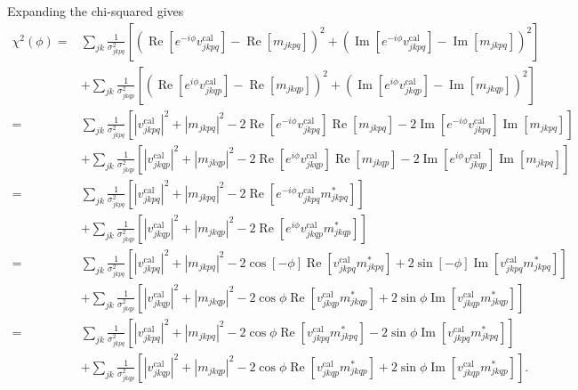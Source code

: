 \documentclass{article}
\newcommand\re{\operatorname{Re}}
\newcommand\im{\operatorname{Im}}
\begin{document}
Expanding the chi-squared gives
\begin{equation}
\begin{split}
\chi^2(\phi) =& \sum_{jk} \frac{1}{\sigma^2_{jkpq}} \left[ \left( \re[e^{-i\phi} v^\text{cal}_{jkpq}] - \re[ m_{jkpq}] \right)^2 + \left( \im[e^{-i\phi} v^\text{cal}_{jkpq}] - \im[ m_{jkpq}] \right)^2 \right] \\
&+ \sum_{jk} \frac{1}{\sigma^2_{jkqp}} \left[ \left( \re[e^{i\phi} v^\text{cal}_{jkqp}] - \re[ m_{jkqp}] \right)^2 + \left( \im[e^{i\phi} v^\text{cal}_{jkqp}] - \im[ m_{jkqp}] \right)^2 \right] \\
=& \sum_{jk} \frac{1}{\sigma^2_{jkpq}} \left[ |v^\text{cal}_{jkpq}|^2 + |m_{jkpq}|^2 - 2\re[e^{-i\phi} v^\text{cal}_{jkpq}]\re[ m_{jkpq}] - 2\im[e^{-i\phi} v^\text{cal}_{jkpq}]\im[ m_{jkpq}] \right] \\
&+ \sum_{jk} \frac{1}{\sigma^2_{jkqp}} \left[ |v^\text{cal}_{jkqp}|^2 + |m_{jkqp}|^2 - 2\re[e^{i\phi} v^\text{cal}_{jkqp}]\re[ m_{jkqp}] - 2\im[e^{i\phi} v^\text{cal}_{jkqp}]\im[ m_{jkpq}] \right] \\
=& \sum_{jk} \frac{1}{\sigma^2_{jkpq}} \left[ |v^\text{cal}_{jkpq}|^2 + |m_{jkpq}|^2 - 2\re[e^{-i\phi} v^\text{cal}_{jkpq} m^*_{jkpq}] \right] \\
&+ \sum_{jk} \frac{1}{\sigma^2_{jkqp}} \left[ |v^\text{cal}_{jkqp}|^2 + |m_{jkqp}|^2 - 2\re[e^{i\phi} v^\text{cal}_{jkqp} m^*_{jkqp}] \right] \\
=& \sum_{jk} \frac{1}{\sigma^2_{jkpq}} \left[ |v^\text{cal}_{jkpq}|^2 + |m_{jkpq}|^2 - 2\cos[-\phi] \re[ v^\text{cal}_{jkpq} m^*_{jkpq}] + 2\sin[-\phi] \im[ v^\text{cal}_{jkpq} m^*_{jkpq}] \right] \\
&+ \sum_{jk} \frac{1}{\sigma^2_{jkqp}} \left[ |v^\text{cal}_{jkqp}|^2 + |m_{jkqp}|^2 - 2 \cos\phi \re[v^\text{cal}_{jkqp} m^*_{jkqp}] + 2 \sin\phi \im[v^\text{cal}_{jkqp} m^*_{jkqp}] \right] \\
=& \sum_{jk} \frac{1}{\sigma^2_{jkpq}} \left[ |v^\text{cal}_{jkpq}|^2 + |m_{jkpq}|^2 - 2\cos\phi \re[ v^\text{cal}_{jkpq} m^*_{jkpq}] - 2\sin\phi \im[ v^\text{cal}_{jkpq} m^*_{jkpq}] \right] \\
&+ \sum_{jk} \frac{1}{\sigma^2_{jkqp}} \left[ |v^\text{cal}_{jkqp}|^2 + |m_{jkqp}|^2 - 2 \cos\phi \re[v^\text{cal}_{jkqp} m^*_{jkqp}] + 2 \sin\phi \im[v^\text{cal}_{jkqp} m^*_{jkqp}] \right]. \\
\end{split}
\end{equation}
\end{document}
